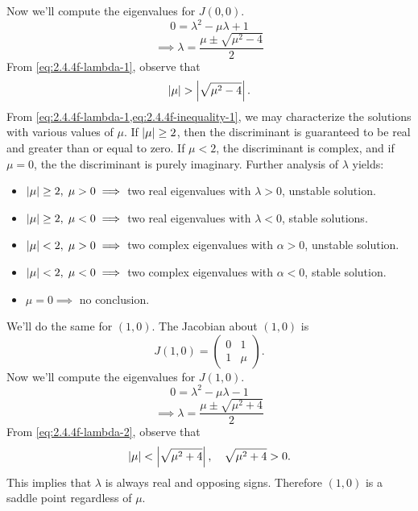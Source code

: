 \documentclass[12pt]{article}
\begin{document}
Now we'll compute the eigenvalues for $J(0,0)$.
\begin{equation*}
  0 = \lambda^2-\mu\lambda + 1
\end{equation*}
\begin{equation}
  \label{eq:2.4.4f-lambda-1}
  \implies\lambda = \frac{\mu \pm \sqrt{\mu^2-4}}{2}
\end{equation}
From \cref{eq:2.4.4f-lambda-1}, observe that
\begin{equation}
  \label{eq:2.4.4f-inequality-1}
  \abs{\mu}>\abs{\sqrt{\mu^2-4}}.
\end{equation}
From \cref{eq:2.4.4f-lambda-1,eq:2.4.4f-inequality-1}, we may characterize the
solutions with various values of $\mu$. If $\left|{\mu}\right|\ge2$, then the
discriminant is guaranteed to be real and greater than or equal to zero. If
$\mu<2$, the discriminant is complex, and if $\mu=0$, the the discriminant is
purely imaginary. Further analysis of $\lambda$ yields:
\begin{itemize}
\item $\left|{\mu}\right|\ge2,\;\mu>0 \implies$ two real eigenvalues with $\lambda>0$, unstable solution.
\item $\left|{\mu}\right|\ge2,\;\mu<0 \implies$ two real eigenvalues with $\lambda<0$, stable solutions.
\item $\left|{\mu}\right|<2,\;\mu>0 \implies$ two complex eigenvalues with $\alpha>0$, unstable solution.
\item $\left|{\mu}\right|<2,\;\mu<0 \implies$ two complex eigenvalues with $\alpha<0$, stable solution.
\item $\mu=0 \implies$ no conclusion.
\end{itemize}
We'll do the same for $(1,0)$. The Jacobian about $(1,0)$ is
\begin{equation*}
  J(1,0) =
  \begin{pmatrix}
    0 & 1 \\ 1 & \mu
  \end{pmatrix}.
\end{equation*}
Now we'll compute the eigenvalues for $J(1,0)$.
\begin{equation*}
  0 = \lambda^2-\mu\lambda-1
\end{equation*}
\begin{equation}
  \label{eq:2.4.4f-lambda-2}
  \implies \lambda = \frac{\mu \pm \sqrt{\mu^2+4}}{2}
\end{equation}
From \cref{eq:2.4.4f-lambda-2}, observe that
\begin{equation}
  \label{eq:2.4.4f-inequality-2}
  \left|{\mu}\right|<\left|{\sqrt{\mu^2+4}}\right|,\quad \sqrt{\mu^2+4}>0.
\end{equation}
This implies that $\lambda$ is always real and opposing signs. Therefore $(1,0)$
is a saddle point regardless of $\mu$.
\end{document}
